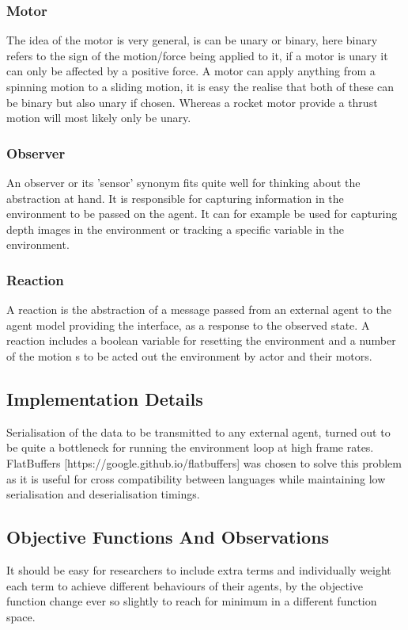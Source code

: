 \subsubsection{Motor}

The idea of the motor is very general, is can be unary or binary, here binary refers to the sign of the motion/force being applied to it, if a motor is unary it can only be affected by a positive force.
A motor can apply anything from a spinning motion to a sliding motion, it is easy the realise that both of these can be binary but also unary if chosen. Whereas a rocket motor provide a thrust motion will most likely only be unary.


\subsubsection{Observer}

An observer or its 'sensor' synonym fits quite well for thinking about the abstraction at hand. It is responsible for capturing information in the environment to be passed on the agent. It can for example be used for capturing depth images in the environment or tracking a specific variable in the environment.

\subsubsection{Reaction}

A reaction is the abstraction of a message passed from an external agent to the agent model providing the interface, as a response to the observed state. A reaction includes a boolean variable for resetting the environment and a number of the motion s to be acted out the environment by actor and their motors.

\subsection{Implementation Details}

Serialisation of the data to be transmitted to any external agent, turned out to be quite a bottleneck for running the environment loop at high frame rates. FlatBuffers [https://google.github.io/flatbuffers] was chosen to solve this problem as it is useful for cross compatibility between languages while maintaining low serialisation and deserialisation timings.

\subsection{Objective Functions And Observations}

It should be easy for researchers to include extra terms and individually weight each term to achieve different behaviours of their agents, by the objective function change ever so slightly to reach for minimum in a different function space.

